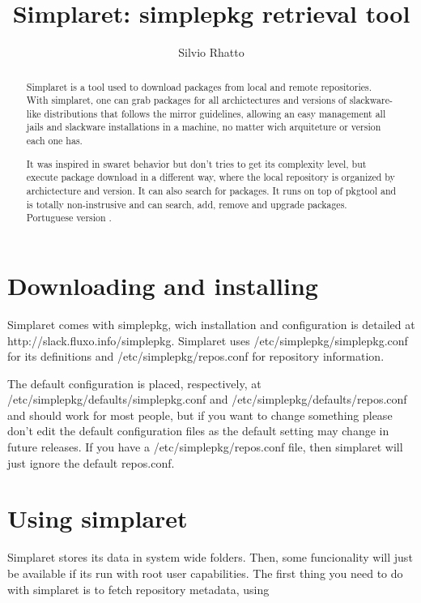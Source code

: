 \documentclass{article}
\title{Simplaret: simplepkg retrieval tool}
\author{Silvio Rhatto}
\begin{document}
\label{start}
\maketitle

\begin{abstract}
Simplaret is a  tool used to download packages from local and remote repositories.  With simplaret, one can grab packages for all archictectures and versions of slackware-like distributions that follows the mirror guidelines, allowing an easy management all jails and slackware installations in a machine, no matter wich arquiteture or version each one has.

It was inspired in swaret behavior but don't tries to get its complexity level, but execute package download in a different way, where the local repository is organized by archictecture and version. It can also search for packages. It runs on top of pkgtool and is totally non-instrusive and can search, add, remove and upgrade packages. Portuguese version .
\end{abstract}

\section{Downloading and installing}

Simplaret comes with simplepkg, wich installation and configuration is detailed at http://slack.fluxo.info/simplepkg. Simplaret uses /etc/simplepkg/simplepkg.conf for its definitions and /etc/simplepkg/repos.conf for repository information.

The default configuration is placed, respectively, at /etc/simplepkg/defaults/simplepkg.conf and /etc/simplepkg/defaults/repos.conf and should work for most people, but if you want to change something please don't edit the default configuration files as the default setting may change in future releases. If you have a /etc/simplepkg/repos.conf file, then simplaret will just ignore the default repos.conf.

\section{Using simplaret}

Simplaret stores its data in system wide folders. Then, some funcionality will just be available if its run with root user capabilities. The first thing you need to do with simplaret is to fetch repository metadata, using
\end{document}
